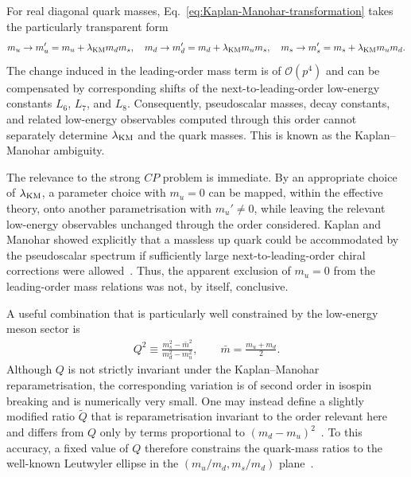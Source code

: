 \documentclass[review]{elsarticle}
\numberwithin{equation}{section}
\numberwithin{table}{section}
\numberwithin{figure}{section}
\begin{document}
For real diagonal quark masses, Eq.~\eqref{eq:Kaplan-Manohar-transformation} takes the particularly transparent form
\begin{align}
    m_u\rightarrow m_u'=m_u+\lambda_{\rm KM}m_dm_s,
    \quad
    m_d\rightarrow m_d'=m_d+\lambda_{\rm KM}m_um_s,
    \quad
    m_s\rightarrow m_s'=m_s+\lambda_{\rm KM}m_um_d. \label{eq:Kaplan-Manohar-diagonal}
\end{align}
The change induced in the leading-order mass term is of $\mathcal{O}(p^4)$ and can be compensated by corresponding shifts of the next-to-leading-order low-energy constants $L_6$, $L_7$, and $L_8$. Consequently, pseudoscalar masses, decay constants, and related low-energy observables computed through this order cannot separately determine $\lambda_{\rm KM}$ and the quark masses. This is known as the Kaplan--Manohar ambiguity.

The relevance to the strong $CP$ problem is immediate. By an appropriate choice of $\lambda_{\rm KM}$, a parameter choice with $m_u=0$ can be mapped, within the effective theory, onto another parametrisation with $m_u'\neq0$, while leaving the relevant low-energy observables unchanged through the order considered. Kaplan and Manohar showed explicitly that a massless up quark could be accommodated by the pseudoscalar spectrum if sufficiently large next-to-leading-order chiral corrections were allowed~\cite{Kaplan:1986ru}. Thus, the apparent exclusion of $m_u=0$ from the leading-order mass relations was not, by itself, conclusive.

A useful combination that is particularly well constrained by the low-energy meson sector is~\cite{Leutwyler:1996qg}
\begin{align}
    Q^2 \equiv \frac{m_s^2-\bar m^2}{m_d^2-m_u^2},
    \qquad
    \bar m=\frac{m_u+m_d}{2}.
    \label{eq:Leutwyler-Q}
\end{align}
Although $Q$ is not strictly invariant under the Kaplan--Manohar reparametrisation, the corresponding variation is of second order in isospin breaking and is numerically very small. One may instead define a slightly modified ratio $\widetilde Q$ that is reparametrisation invariant to the order relevant here and differs from $Q$ only by terms proportional to $(m_d-m_u)^2$~\cite{Leutwyler:2023ldz}. To this accuracy, a fixed value of $Q$ therefore constrains the quark-mass ratios to the well-known Leutwyler ellipse in the $(m_u/m_d,m_s/m_d)$ plane~\cite{Leutwyler:1996qg}.
\end{document}
